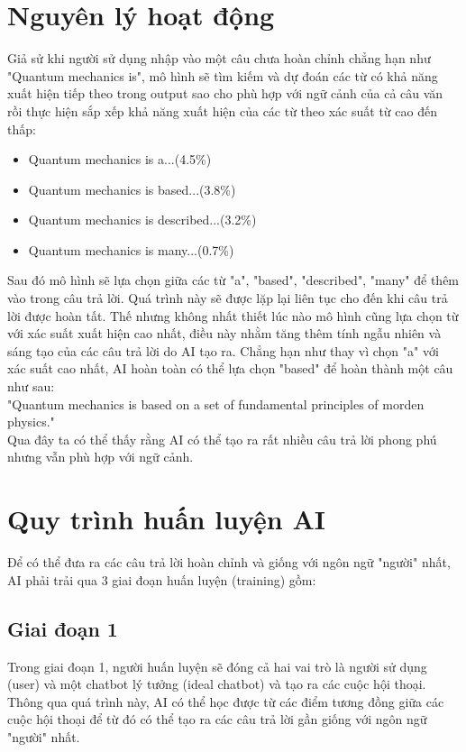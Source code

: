 \section{Nguyên lý hoạt động}
Giả sử khi người sử dụng nhập vào một câu chưa hoàn chỉnh chẳng hạn như "Quantum mechanics is", mô hình sẽ tìm kiếm và dự đoán các từ có khả năng xuất hiện tiếp theo trong output sao cho phù hợp với ngữ cảnh của cả câu văn rồi
thực hiện sắp xếp khả năng xuất hiện của các từ theo xác suất từ cao đến thấp: \cite{link_8}
\begin{itemize}
    \item Quantum mechanics is a...(4.5\%)
    \item Quantum mechanics is based...(3.8\%)
    \item Quantum mechanics is described...(3.2\%)
    \item Quantum mechanics is many...(0.7\%)
\end{itemize}
Sau đó mô hình sẽ lựa chọn giữa các từ "a", "based", "described", "many" để thêm vào trong câu trả lời. Quá trình này sẽ được lặp
lại liên tục cho đến khi câu trả lời được hoàn tất. Thế nhưng không nhất thiết lúc nào mô hình cũng lựa chọn từ với xác suất xuất hiện cao nhất, điều này nhằm tăng thêm tính ngẫu nhiên và sáng tạo của các câu trả lời do AI tạo ra.
Chẳng hạn như thay vì chọn "a" với xác suất cao nhất, AI hoàn toàn có thể lựa chọn "based" để hoàn thành một câu như sau:
\\"Quantum mechanics is based on a set of fundamental principles of morden physics."
\\Qua đây ta có thể thấy rằng AI có thể tạo ra rất nhiều câu trả lời phong phú nhưng vẫn phù hợp với ngữ cảnh.
\section{Quy trình huấn luyện AI}
Để có thể đưa ra các câu trả lời hoàn chỉnh và giống với ngôn ngữ "người" nhất, AI phải trải qua 3 giai đoạn huấn luyện (training) gồm:
\subsection{Giai đoạn 1}
Trong giai đoạn 1, người huấn luyện sẽ đóng cả hai vai trò là người sử dụng (user) và một chatbot lý tưởng (ideal chatbot) và tạo ra các cuộc hội thoại. Thông qua quá trình này, AI có thể học được từ các điểm tương đồng giữa các cuộc hội thoại để từ đó có thể tạo ra các câu trả lời 
gần giống với ngôn ngữ "người" nhất.
